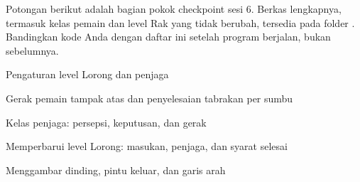 Potongan berikut adalah bagian pokok checkpoint sesi 6. Berkas lengkapnya,
termasuk kelas pemain dan level Rak yang tidak berubah, tersedia pada folder
. Bandingkan kode Anda dengan daftar ini setelah program
berjalan, bukan sebelumnya.

  {Pengaturan level Lorong dan penjaga}

  {Gerak pemain tampak atas dan penyelesaian tabrakan per sumbu}

  {Kelas penjaga: persepsi, keputusan, dan gerak}

  {Memperbarui level Lorong: masukan, penjaga, dan syarat selesai}

  {Menggambar dinding, pintu keluar, dan garis arah}



